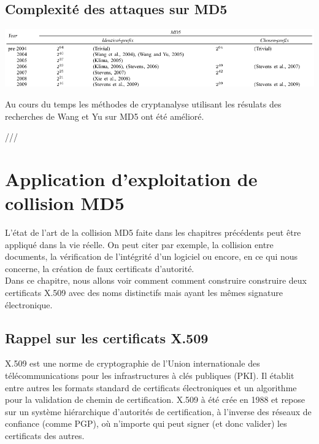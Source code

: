 \documentclass[a4paper,11pt,french]{article}
\begin{document}
\subsection{Complexité des attaques sur MD5}

\includegraphics[scale=.50]{./pics/complexite.png}

\vspace{.5cm}
Au cours du temps les méthodes de cryptanalyse utilisant les résulats des recherches de Wang et Yu sur MD5 ont été amélioré. 

///

\section{Application d'exploitation de collision MD5}

L'état de l'art de la collision MD5 faite dans les chapitres précédents peut être appliqué dans la vie réelle. On peut citer par exemple, la collision entre documents, la vérification de l'intégrité d'un logiciel ou encore, en ce qui nous concerne, la création de faux certificats d'autorité. \\

Dans ce chapitre, nous allons voir comment comment construire construire deux certificats X.509 avec des noms distinctifs mais ayant les mêmes signature électronique.

\subsection{Rappel sur les certificats X.509}

X.509 est une norme de cryptographie de l'Union internationale des télécommunications pour les infrastructures à clés publiques (PKI). Il établit entre autres les formats standard de certificats électroniques et un algorithme pour la validation de chemin de certification. X.509 à été crée en 1988  et repose sur un système hiérarchique d'autorités de certification, à l'inverse des réseaux de confiance (comme PGP), où n'importe qui peut signer (et donc valider) les certificats des autres.\\
\end{document}
